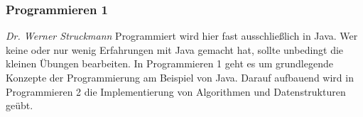 
\subsubsection{Programmieren 1}
	\textit{Dr. Werner Struckmann}
	Programmiert wird hier fast ausschließlich in Java. Wer keine oder nur wenig Erfahrungen mit Java gemacht hat, sollte unbedingt die kleinen Übungen bearbeiten.
	In Programmieren 1 geht es um grundlegende Konzepte der Programmierung am Beispiel von Java. Darauf aufbauend wird in Programmieren 2 die Implementierung von Algorithmen und Datenstrukturen geübt. 